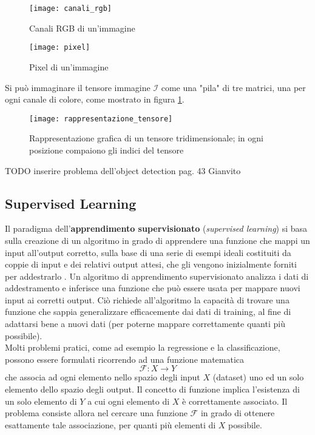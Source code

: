 \begin{figure}
  \begin{minipage}[b]{0.46\textwidth}
    \texttt{[image: canali\_rgb]}
    \caption{Canali RGB di un'immagine}
  \end{minipage}
  \hfill
  \begin{minipage}[b]{0.46\textwidth}
    \texttt{[image: pixel]}
    \caption{Pixel di un'immagine}
  \end{minipage}
\end{figure}

Si può immaginare il tensore immagine $\mathcal{I}$ come una "pila" di tre matrici, una per ogni canale di colore, come mostrato in figura \ref{rappresentazione_tensore}.

\begin{figure}
\centering
\texttt{[image: rappresentazione\_tensore]}
\caption{Rappresentazione grafica di un tensore tridimensionale; in ogni posizione compaiono gli indici del tensore}
\label{rappresentazione_tensore}
\end{figure}

TODO inserire problema dell'object detection pag. 43 Gianvito

\subsection{Supervised Learning}

Il paradigma dell'\textbf{apprendimento supervisionato} (\textit{supervised learning}) si basa sulla creazione di un algoritmo in grado di apprendere una funzione che mappi un input all'output corretto, sulla base di una serie di esempi ideali costituiti da coppie di input e dei relativi output attesi, che gli vengono inizialmente forniti per addestrarlo \cite{Russell2009}.
Un algoritmo di apprendimento supervisionato analizza i dati di addestramento e inferisce una funzione che può essere usata per mappare nuovi input ai corretti output. Ciò richiede all'algoritmo la capacità di trovare una funzione che sappia generalizzare efficacemente dai dati di training, al fine di adattarsi bene a nuovi dati (per poterne mappare correttamente quanti più possibile).\\

Molti problemi pratici, come ad esempio la regressione e la classificazione, possono essere formulati ricorrendo ad una funzione matematica
\[\mathcal{F}:X\to Y\]
che associa ad ogni elemento nello spazio degli input $X$ (dataset) uno ed un solo elemento dello spazio degli output.
Il concetto di funzione implica l'esistenza di un solo elemento di $Y$ a cui ogni elemento di $X$ è correttamente associato. Il problema consiste allora nel cercare una funzione $\mathcal{F}$ in grado di ottenere esattamente tale associazione, per quanti più elementi di $X$ possibile.

